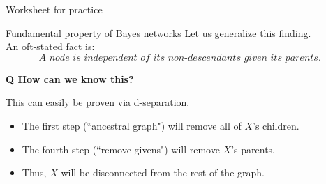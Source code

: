 \documentclass[10pt]{beamer}
\begin{document}
 
\begin{frame}{Worksheet for practice}
\end{frame}


\begin{frame}{Fundamental property of Bayes networks}
Let us generalize this finding. \\

An oft-stated fact is:
\[ \textit{A node is independent of its non-descendants given its parents. } \]

\tiny \bf{Q} How can we know this?  \normalsize \pause 

This can easily be proven via d-separation.  
\begin{itemize}
\item The first step (``ancestral graph") will remove all of $X$'s children.
\item The fourth step (``remove givens") will remove $X$'s parents. 
\item Thus, $X$ will be disconnected from the rest of the graph.
\end{itemize}
\end{frame}
\end{document}

